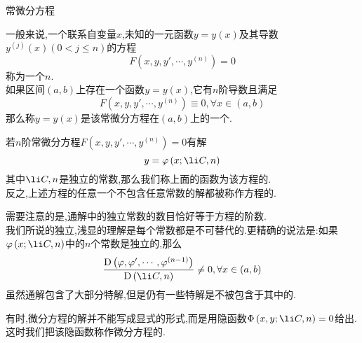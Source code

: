 \documentclass{ctexart}
\begin{document}
\pagestyle{empty}
\begin{center}\large 常微分方程\end{center}
\begin{definition}[1.1 定义:常微分方程]
    一般来说,一个联系自变量$x$,未知的一元函数$y=y(x)$及其导数$y^{(j)}(x)(0<j\leqslant n)$的方程
    \[F\left(x,y,y',\cdots,y^{(n)}\right)=0\]
    称为一个$n$.\\
    如果区间$(a,b)$上存在一个函数$y=y(x)$,它有$n$阶导数且满足
    \[F\left(x,y,y',\cdots,y^{(n)}\right)\equiv0,\forall x\in(a,b)\]
    那么称$y=y(x)$是该常微分方程在$(a,b)$上的一个.
\end{definition}
\begin{definition}[1.2 定义:通解与特解]
    若$n$阶常微分方程$F\left(x,y,y',\cdots,y^{(n)}\right)=0$有解
    \[y=\varphi\left(x;\li C,n\right)\]
    其中$\li C,n$是独立的常数,那么我们称上面的函数为该方程的.\\
    反之,上述方程的任意一个不包含任意常数的解都被称作方程的.
\end{definition}\noindent
需要注意的是,通解中的独立常数的数目恰好等于方程的阶数.\\
我们所说的独立,浅显的理解是每个常数都是不可替代的.更精确的说法是:如果$\varphi\left(x;\li C,n\right)$中的$n$个常数是独立的,那么
\[\dfrac{\text{D}\left(\varphi,\varphi',\cdots,\varphi^{(n-1)}\right)}{\text{D}\left(\li C,n\right)}\neq0,\forall x\in (a,b)\]
虽然通解包含了大部分特解,但是仍有一些特解是不被包含于其中的.
\begin{definition}[1.3 定义:通积分]
    有时,微分方程的解并不能写成显式的形式,而是用隐函数$\Phi\left(x,y;\li C,n\right)=0$给出.这时我们把该隐函数称作微分方程的.
\end{definition}
\end{document}
